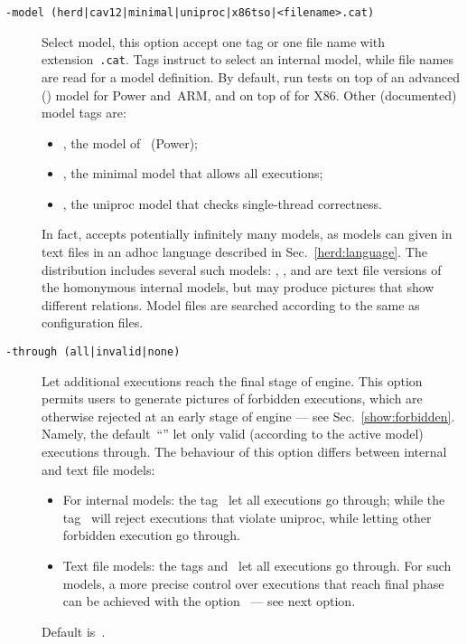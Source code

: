 \begin{description}
\item[{\tt -model (herd|cav12|minimal|uniproc|x86tso|<filename>.cat)}]
Select model, this option accept one tag or one file name
with extension~\texttt{.cat}.
Tags instruct \herd{} to select an internal model,
while file names are read for a model definition.
By default, \herd{} run tests on top of an advanced ()
model for Power and~ARM,
and on top of  for X86.
Other (documented) model tags are:
\begin{itemize}
\item {}, the model of~\cite{mms12} (Power);
\item {}, the minimal model that allows all executions;
\item {}, the uniproc model that checks single-thread correctness.
\end{itemize}

In fact, \herd{} accepts potentially infinitely many models,
as models can given in text files in an adhoc language described in
Sec.~\ref{herd:language}.
The \herd{} distribution includes several such models:
, , 
and  are
text file versions of the homonymous internal models, but may
produce pictures that show different relations.
Model files are searched according to  the same
as configuration files.

\item[{\tt -through (all|invalid|none)}]
Let additional executions reach the final stage of \herd{} engine.
This option permits users to generate pictures of forbidden executions, which
are otherwise rejected at an early stage of \herd{} engine --- see Sec.~\ref{show:forbidden}.
Namely, the default~``'' let only valid (according to the
active model) executions through.
The behaviour of this option differs between internal and text file models:
\begin{itemize}
\item For internal models:
the tag~ let all executions go through;
while the tag~ will reject executions that violate uniproc,
while letting other forbidden execution go through.
\item Text file models: the tags  and~ let all
executions go through. For such models, a more precise control over
executions that reach \herd{} final phase can be achieved
with the option~ --- see  next option.
\end{itemize}
Default is~.


\end{description}
